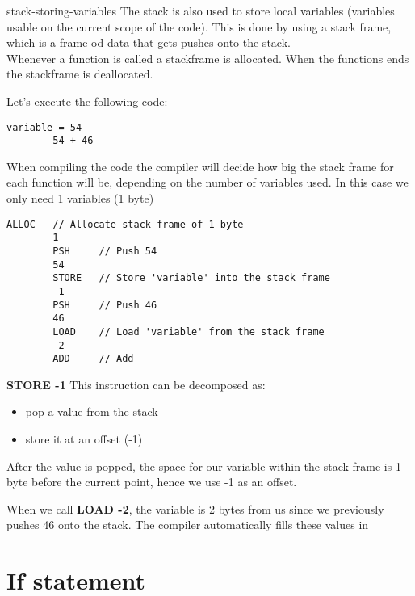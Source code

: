 \documentclass[preview]{standalone}
\begin{document}
\begin{snippet}{stack-storing-variables}
    The stack is also used to store local variables (variables usable on the current scope of the code).
    This is done by using a stack frame, which is a frame od data that gets pushes onto the stack.
    \\
    Whenever a function is called a stackframe is allocated. When the functions ends the stackframe is deallocated.

    Let's execute the following code:
    \begin{lstlisting}[style=generic]
        variable = 54
        54 + 46
    \end{lstlisting}

    When compiling the code the compiler will decide how big the stack frame for each function will be,
    depending on the number of variables used. In this case we only need 1 variables (1 byte)

    \begin{lstlisting}[style=generic]
        ALLOC   // Allocate stack frame of 1 byte
        1
        PSH     // Push 54
        54
        STORE   // Store 'variable' into the stack frame
        -1
        PSH     // Push 46
        46
        LOAD    // Load 'variable' from the stack frame
        -2
        ADD     // Add
    \end{lstlisting}

    \textbf{STORE -1}
    This instruction can be decomposed as:

    \begin{itemize}
        \item pop a value from the stack
        \item store it at an offset (-1)
    \end{itemize}

    After the value is popped, the space for our variable within the stack frame is 1 byte before the current point,
    hence we use -1 as an offset.

    When we call \textbf{LOAD -2}, the variable is 2 bytes from us since we previously pushes 46 onto the stack.
    The compiler automatically fills these values in
\end{snippet}

\section{If statement}
\end{document}
